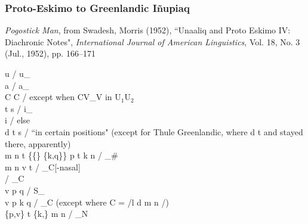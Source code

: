 \documentclass[11pt]{article}
\begin{document}
\subsubsection{Proto-Eskimo to Greenlandic I\~{n}upiaq}{\it Pogostick Man}, from Swadesh, Morris (1952), \textquotedblleft Unaaliq and Proto Eskimo IV: Diachronic Notes", \textit{International Journal of American Linguistics}, Vol. 18, No. 3 (Jul., 1952), pp. 166--171

 \textrightarrow\hspace{0pt} u / u_ \\
 \textrightarrow\hspace{0pt} a / a_ \\
C\textipa{:} \textrightarrow\hspace{0pt} C / except when CV_V in U$_1$U$_2$ \\
t \textrightarrow\hspace{0pt} s / i_ \\ %
 \textrightarrow\hspace{0pt} i / else \\
d \textrightarrow\hspace{0pt} t \textrightarrow\hspace{0pt} s / \textquotedblleft in certain positions" (except for Thule Greenlandic, where d \textrightarrow\hspace{0pt} t and stayed there, apparently) \\
m n  t \{\{\} \textrightarrow\hspace{0pt} \{k,q\}\} \textrightarrow\hspace{0pt} p t k n  / _\# \\
m n  \textrightarrow\hspace{0pt} v t  / _C[-nasal] \\
 \textrightarrow\hspace{0pt}  / _C \\
v  \textrightarrow\hspace{0pt} p q / S_ \\
v  \textrightarrow\hspace{0pt} p k q / _C (except where C = /l d m n /) \\
\{p,v\} t \{k,\} \textrightarrow\hspace{0pt} m n  / _N \\
\end{document}
